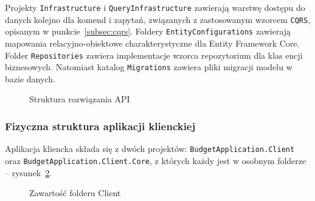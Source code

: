 Projekty \texttt{Infrastructure} i \texttt{QueryInfrastructure} zawierają warstwę dostępu do danych kolejno dla komend i zapytań, związanych z zastosowanym wzorcem \texttt{CQRS}, opisanym w punkcie~\ref{subsec:cqrs}. Foldery \texttt{EntityConfigurations} zawierają mapowania relacyjno-obiektowe charakterystyczne dla Entity Framework Core. Folder \texttt{Repositories} zawiera implementacje wzorca repozytorium dla klas encji biznesowych. Natomiast katalog \texttt{Migrations} zawiera pliki migracji modelu w bazie danych.

\begin{figure}[t]
	\centering
	\caption{Struktura rozwiązania API}
	\label{fig:fiz-api-2}
\end{figure}

\subsubsection{Fizyczna struktura aplikacji klienckiej}

Aplikacja kliencka składa się z dwóch projektów: \texttt{BudgetApplication.Client} oraz \texttt{BudgetApplication.Client.Core}, z których każdy jest w osobnym folderze -- rysunek~\ref{fig:fiz-client-1}. 

\begin{figure}[t]
	\centering
	\caption{Zawartość folderu Client}
	\label{fig:fiz-client-1}
\end{figure}

